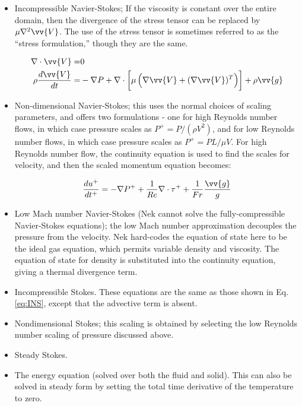 \documentclass[10pt]{article}
\newcommand{\beq}{\begin{equation}}
\newcommand{\eeq}{\end{equation}}
\newcommand{\beqa}{\begin{equation}\begin{aligned}}
\newcommand{\eeqa}{\end{aligned}\end{equation}}
\numberwithin{equation}{section} %
\begin{document}
\begin{itemize}
\item Incompressible Navier-Stokes; If the viscosity is constant over the entire domain, then the divergence of the stress tensor can be replaced by \(\mu\nabla^2\vv{V}\). The use of the stress tensor is sometimes referred to as the ``stress formulation,'' though they are the same. 

\beqa
\label{eq:INS}
\nabla\cdot\vv{V}=&0\\
\rho\frac{d\vv{V}}{dt}=&-\nabla P+\nabla\cdot\left\lbrack\mu\left(\nabla\vv{V}+(\nabla\vv{V})^T\right)\right\rbrack+\rho\vv{g}\\
\eeqa

\item Non-dimensional Navier-Stokes; this uses the normal choices of scaling parameters, and offers two formulations - one for high Reynolds number flows, in which case pressure scales as \(P^{+}=P/(\rho V^2)\), and for low Reynolds number flows, in which case pressure scales as \(P^{+}=PL/\mu V\). For high Reynolds number flow, the continuity equation is used to find the scales for velocity, and then the scaled momentum equation becomes:

\beq
\frac{du^{+}}{dt^+}=-\nabla P^++\frac{1}{Re}\nabla\cdot\tau^++\frac{1}{Fr}\frac{\vv{g}}{g}
\eeq

\item Low Mach number Navier-Stokes (Nek cannot solve the fully-compressible Navier-Stokes equations); the low Mach number approximation decouples the pressure from the velocity. Nek hard-codes the equation of state here to be the ideal gas equation, which permits variable density and viscosity. The equation of state for density is substituted into the continuity equation, giving a thermal divergence term. 

\item Incompressible Stokes. These equations are the same as those shown in Eq. \eqref{eq:INS}, except that the advective term is absent. 

\item Nondimensional Stokes; this scaling is obtained by selecting the low Reynolds number scaling of pressure discussed above.

\item Steady Stokes.
 
\item The energy equation (solved over both the fluid and solid). This can also be solved in steady form by setting the total time derivative of the temperature to zero.


\end{itemize}
\end{document}
